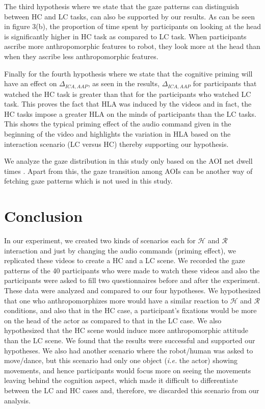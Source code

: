 \documentclass{acm_proc_article-sp}
\begin{document}
The third hypothesis where we state that the gaze patterns can distinguish
between HC and LC tasks, can also be supported by our results. As can be seen in
figure 3(b), the proportion of time spent by participants on looking at the head
is significantly higher in HC task as compared to LC task. When participants
ascribe more anthropomorphic features to robot, they look more at the head than
when they ascribe less anthropomorphic features.

Finally for the fourth hypothesis where we state that the cognitive priming will
have an effect on $\Delta_{ICA,AAP}$, as seen in the results, $\Delta_{ICA,AAP}$
for participants that watched the HC task is greater than that for the
participants who watched LC task. This proves the fact that HLA was induced by
the videos and in fact, the HC tasks impose a greater HLA on the minds of
participants than the LC tasks. This shows the typical priming effect of the
audio command given in the beginning of the video and highlights the variation
in HLA based on the interaction scenario (LC versus HC) thereby supporting our
hypothesis. 

We analyze the gaze distribution in this study only based on the AOI net dwell
times . Apart from this, the gaze transition among AOIs can be another way of
fetching gaze patterns which is not used in this study.

\section{Conclusion}

In our experiment, we created two kinds of scenarios each for $\mathcal{H}$ and
$\mathcal{R}$ interaction and just by changing the audio commands (priming
effect), we replicated these videos to create a HC and a LC scene. We recorded
the gaze patterns of the 40 participants who were made to watch these videos and
also the participants were asked to fill two questionnaires before and after the
experiment. These data were analyzed and compared to our four hypotheses. We
hypothesized that one who anthropomorphizes more would have a similar reaction
to $\mathcal{H}$ and $\mathcal{R}$ conditions, and also that in the HC case, a
participant's fixations would be more on the head of the actor as compared to
that in the LC case. We also hypothesized that the HC scene would induce more
anthropomorphic attitude than the LC scene. We found that the results were
successful and supported our hypotheses. We also had another scenario where the
robot/human was asked to move/dance, but this scenario had only one object
(\textit{i.e.} the actor) showing movements, and hence participants would focus
more on seeing the movements leaving behind the cognition aspect, which made it
difficult to differentiate between the LC and HC cases and, therefore, we
discarded this scenario from our analysis.
\end{document}
